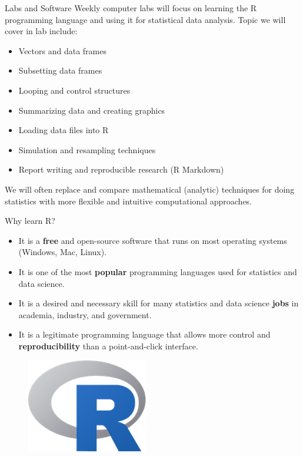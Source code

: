 \documentclass[10pt]{beamer}
\begin{document}
\begin{frame}{Labs and Software}
Weekly computer labs will focus on learning the R programming language and using it for statistical data analysis.  Topic we will cover in lab include:\\
\begin{itemize}
\item Vectors and data frames
\item Subsetting data frames
\item Looping and control structures
\item Summarizing data and creating graphics
\item Loading data files into R
\item Simulation and resampling techniques
\item Report writing and reproducible research (R Markdown)\\
\end{itemize}

We will often replace and compare mathematical (analytic) techniques for doing statistics with more flexible and intuitive computational approaches.  
\end{frame}

\begin{frame}{Why learn R?} 
\begin{itemize}
\item It is a \textbf{free} and open-source software that runs on most operating systems (Windows, Mac, Linux).  
\item It is one of the most \textbf{popular} programming languages used for statistics and data science.  
\item It is a desired and necessary skill for many statistics and data science \textbf{jobs} in academia, industry, and government.
\item It is a legitimate programming language that allows more control and \textbf{reproducibility} than a point-and-click interface. 
\end{itemize}
\begin{figure}
\flushright
\includegraphics[scale=0.2]{figure/Rlogo.png}
\end{figure}
\end{frame}
\end{document}
